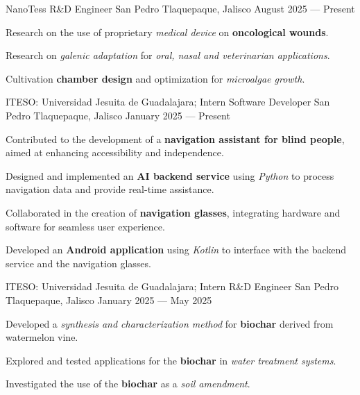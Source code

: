 \begin{cventries}

  \cventry
  {NanoTess}
  {R\&D Engineer}
  {San Pedro Tlaquepaque, Jalisco}
  {August 2025 --- Present}
  {
    \begin{cvitems}
      \item {Research on the use of proprietary \textit{medical device} on \textbf{oncological wounds}.}
      \item {Research on \textit{galenic adaptation} for \textit{oral, nasal and veterinarian applications}.}
      \item {Cultivation \textbf{chamber design} and optimization for \textit{microalgae growth}.}
    \end{cvitems}
  }

  \cventry
  {ITESO\@: Universidad Jesuita de Guadalajara; Intern}
  {Software Developer}
  {San Pedro Tlaquepaque, Jalisco}
  {January 2025 --- Present}
  {
    \begin{cvitems}
      \item {Contributed to the development of a \textbf{navigation assistant for blind people}, aimed at enhancing accessibility and independence.}
      \item {Designed and implemented an \textbf{AI backend service} using \textit{Python} to process navigation data and provide real-time assistance.}
      \item {Collaborated in the creation of \textbf{navigation glasses}, integrating hardware and software for seamless user experience.}
      \item {Developed an \textbf{Android application} using \textit{Kotlin} to interface with the backend service and the navigation glasses.}
    \end{cvitems}
  }

  \cventry
  {ITESO\@: Universidad Jesuita de Guadalajara; Intern}
  {R\&D Engineer}
  {San Pedro Tlaquepaque, Jalisco}
  {January 2025 --- May 2025}
  {
    \begin{cvitems}
      \item {Developed a \textit{synthesis and characterization method} for \textbf{biochar} derived from watermelon vine.}
      \item {Explored and tested applications for the \textbf{biochar} in \textit{water treatment systems}.}
      \item {Investigated the use of the \textbf{biochar} as a \textit{soil amendment}.}
    \end{cvitems}
  }


\end{cventries}

